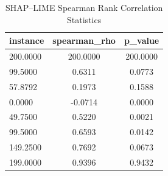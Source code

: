\begin{table}
\centering
\caption{SHAP–LIME Spearman Rank Correlation Statistics}
\label{tab:agreement}
\begin{tabular}{lcc}
\toprule
instance & spearman_rho & p_value \\
\midrule
200.0000 & 200.0000 & 200.0000 \\
99.5000 & 0.6311 & 0.0773 \\
57.8792 & 0.1973 & 0.1588 \\
0.0000 & -0.0714 & 0.0000 \\
49.7500 & 0.5220 & 0.0021 \\
99.5000 & 0.6593 & 0.0142 \\
149.2500 & 0.7692 & 0.0673 \\
199.0000 & 0.9396 & 0.9432 \\
\bottomrule
\end{tabular}
\end{table}
